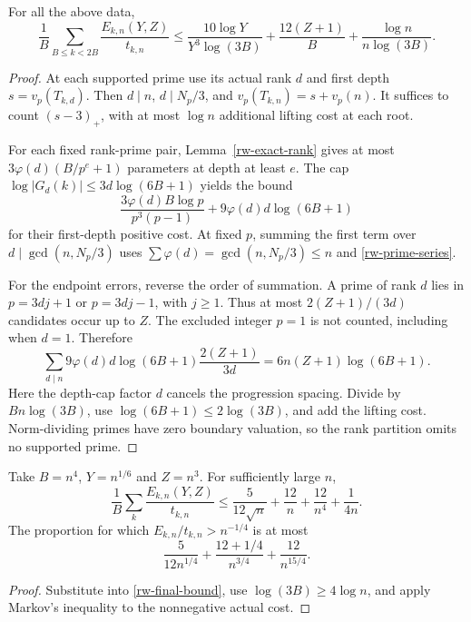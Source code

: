 \begin{theorem}
\label{rw-main}
For all the above data,
\begin{equation}\label{rw-final-bound}
 \frac1B\sum_{B\le k<2B}\frac{E_{k,n}(Y,Z)}{t_{k,n}}
 \le \frac{10\log Y}{Y^3\log(3B)}
       +\frac{12(Z+1)}B+\frac{\log n}{n\log(3B)}.
\end{equation}
\end{theorem}
\begin{proof}
At each supported prime use its actual rank $d$ and first depth
$s=v_p(T_{k,d})$. Then $d\mid n$, $d\mid N_p/3$, and
$v_p(T_{k,n})=s+v_p(n)$. It suffices to count $(s-3)_+$, with
at most $\log n$ additional lifting cost at each root.

For each fixed rank-prime pair, Lemma~\ref{rw-exact-rank} gives
at most $3\varphi(d)(B/p^e+1)$ parameters at depth at least $e$.
The cap $\log|G_d(k)|\le3d\log(6B+1)$ yields the bound
\[
 \frac{3\varphi(d)B\log p}{p^3(p-1)}
       +9\varphi(d)d\log(6B+1)
\]
for their first-depth positive cost. At fixed $p$, summing the first
term over $d\mid\gcd(n,N_p/3)$ uses
$\sum\varphi(d)=\gcd(n,N_p/3)\le n$ and
\eqref{rw-prime-series}.

For the endpoint errors, reverse the order of summation. A prime
of rank $d$ lies in $p=3dj+1$ or $p=3dj-1$, with $j\ge1$.
Thus at most $2(Z+1)/(3d)$ candidates occur up to $Z$. The excluded
integer $p=1$ is not counted, including when $d=1$. Therefore
\[
 \sum_{d\mid n}9\varphi(d)d\log(6B+1)\frac{2(Z+1)}{3d}
       =6n(Z+1)\log(6B+1).
\]
Here the depth-cap factor $d$ cancels the progression spacing.
Divide by $Bn\log(3B)$, use $\log(6B+1)\le2\log(3B)$, and add
the lifting cost. Norm-dividing primes have zero boundary valuation,
so the rank partition omits no supported prime.
\end{proof}

\begin{corollary}
\label{rw-polynomial}
Take $B=n^4$, $Y=n^{1/6}$ and $Z=n^3$. For sufficiently large $n$,
\[
 \frac1B\sum_k\frac{E_{k,n}(Y,Z)}{t_{k,n}}
 \le\frac5{12\sqrt n}+\frac{12}n+\frac{12}{n^4}+\frac1{4n}.
\]
The proportion for which $E_{k,n}/t_{k,n}>n^{-1/4}$ is at most
\[
 \frac5{12n^{1/4}}+\frac{12+1/4}{n^{3/4}}+\frac{12}{n^{15/4}}.
\]
\end{corollary}
\begin{proof}
Substitute into \eqref{rw-final-bound}, use
$\log(3B)\ge4\log n$, and apply Markov's inequality to the
nonnegative actual cost.
\end{proof}

